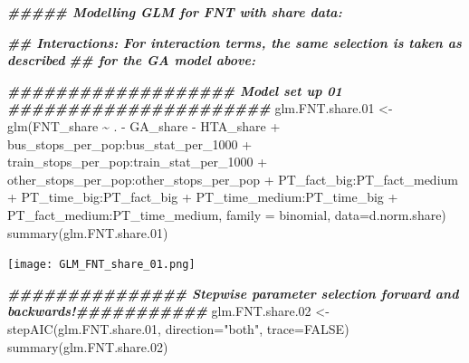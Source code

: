\documentclass[
]{article}
\newenvironment{Shaded}{\begin{snugshade}}{\end{snugshade}}
\newcommand{\AttributeTok}[1]{\textcolor[rgb]{0.77,0.63,0.00}{#1}}
\newcommand{\ConstantTok}[1]{\textcolor[rgb]{0.00,0.00,0.00}{#1}}
\newcommand{\DocumentationTok}[1]{\textcolor[rgb]{0.56,0.35,0.01}{\textbf{\textit{#1}}}}
\newcommand{\FloatTok}[1]{\textcolor[rgb]{0.00,0.00,0.81}{#1}}
\newcommand{\FunctionTok}[1]{\textcolor[rgb]{0.00,0.00,0.00}{#1}}
\newcommand{\NormalTok}[1]{#1}
\newcommand{\OtherTok}[1]{\textcolor[rgb]{0.56,0.35,0.01}{#1}}
\newcommand{\SpecialCharTok}[1]{\textcolor[rgb]{0.00,0.00,0.00}{#1}}
\newcommand{\StringTok}[1]{\textcolor[rgb]{0.31,0.60,0.02}{#1}}
\begin{document}
\begin{Shaded}
\begin{Highlighting}[]
\DocumentationTok{\#\#\#\#\#  Modelling GLM for FNT with share data:}

\DocumentationTok{\#\# Interactions: For interaction terms, the same selection is taken as described}
\DocumentationTok{\#\# for the GA model above:}

\DocumentationTok{\#\#\#\#\#\#\#\#\#\#\#\#\#\#\#\#\#\#\# Model set up 01 \#\#\#\#\#\#\#\#\#\#\#\#\#\#\#\#\#\#\#\#\#\#}
\NormalTok{glm.FNT.share}\FloatTok{.01} \OtherTok{\textless{}{-}} \FunctionTok{glm}\NormalTok{(FNT\_share }\SpecialCharTok{\textasciitilde{}}\NormalTok{ . }\SpecialCharTok{{-}}\NormalTok{ GA\_share }\SpecialCharTok{{-}}\NormalTok{ HTA\_share}
                    \SpecialCharTok{+}\NormalTok{ bus\_stops\_per\_pop}\SpecialCharTok{:}\NormalTok{bus\_stat\_per\_1000}
                    \SpecialCharTok{+}\NormalTok{ train\_stops\_per\_pop}\SpecialCharTok{:}\NormalTok{train\_stat\_per\_1000}
                    \SpecialCharTok{+}\NormalTok{ other\_stops\_per\_pop}\SpecialCharTok{:}\NormalTok{other\_stops\_per\_pop}
                    \SpecialCharTok{+}\NormalTok{ PT\_fact\_big}\SpecialCharTok{:}\NormalTok{PT\_fact\_medium}
                    \SpecialCharTok{+}\NormalTok{ PT\_time\_big}\SpecialCharTok{:}\NormalTok{PT\_fact\_big}
                    \SpecialCharTok{+}\NormalTok{ PT\_time\_medium}\SpecialCharTok{:}\NormalTok{PT\_time\_big}
                    \SpecialCharTok{+}\NormalTok{ PT\_fact\_medium}\SpecialCharTok{:}\NormalTok{PT\_time\_medium, }
                \AttributeTok{family =}\NormalTok{ binomial, }\AttributeTok{data=}\NormalTok{d.norm.share)}
\FunctionTok{summary}\NormalTok{(glm.FNT.share}\FloatTok{.01}\NormalTok{)}
\end{Highlighting}
\end{Shaded}

\texttt{[image: GLM\_FNT\_share\_01.png]}

\begin{Shaded}
\begin{Highlighting}[]
\DocumentationTok{\#\#\#\#\#\#\#\#\#\#\#\#\#\#\# Stepwise parameter selection forward and backwards!\#\#\#\#\#\#\#\#\#\#\#}
\NormalTok{glm.FNT.share}\FloatTok{.02} \OtherTok{\textless{}{-}} \FunctionTok{stepAIC}\NormalTok{(glm.FNT.share}\FloatTok{.01}\NormalTok{, }\AttributeTok{direction=}\StringTok{"both"}\NormalTok{, }\AttributeTok{trace=}\ConstantTok{FALSE}\NormalTok{)}
\FunctionTok{summary}\NormalTok{(glm.FNT.share}\FloatTok{.02}\NormalTok{)}
\end{Highlighting}
\end{Shaded}
\end{document}
